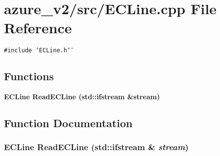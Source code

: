\section{azure\_\-v2/src/ECLine.cpp File Reference}
\label{ECLine_8cpp}
{\tt \#include \char`\"{}ECLine.h\char`\"{}}\par
\subsection*{Functions}
\begin{CompactItemize}
\item 
\bf{ECLine} \bf{Read\-ECLine} (std::ifstream \&stream)
\end{CompactItemize}


\subsection{Function Documentation}
\subsubsection{\setlength{\rightskip}{0pt plus 5cm}\bf{ECLine} Read\-ECLine (std::ifstream \& {\em stream})}\label{ECLine_8cpp_034ec92e8c55be47fa6ebd2dcd3477bd}


